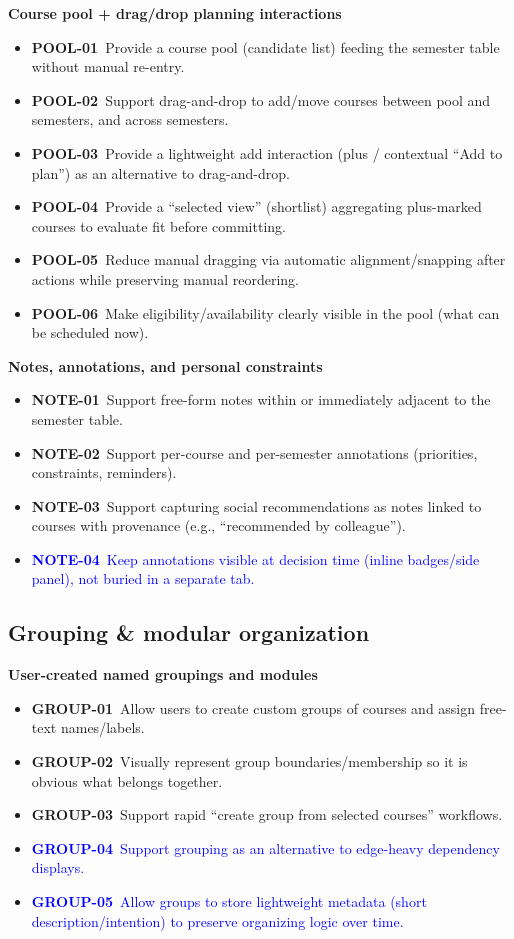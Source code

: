 \textbf{Course pool + drag/drop planning interactions}
\begin{itemize}
  \item \textbf{POOL-01}~Provide a course pool (candidate list) feeding the semester table without manual re-entry.
  \item \textbf{POOL-02}~Support drag-and-drop to add/move courses between pool and semesters, and across semesters.
  \item \textbf{POOL-03}~Provide a lightweight add interaction (plus / contextual “Add to plan”) as an alternative to drag-and-drop.
  \item \textbf{POOL-04}~Provide a “selected view” (shortlist) aggregating plus-marked courses to evaluate fit before committing.
  \item \textbf{POOL-05}~Reduce manual dragging via automatic alignment/snapping after actions while preserving manual reordering.
  \item \textbf{POOL-06}~Make eligibility/availability clearly visible in the pool (what can be scheduled now).
\end{itemize}

\textbf{Notes, annotations, and personal constraints}
\begin{itemize}
  \item \textbf{NOTE-01}~Support free-form notes within or immediately adjacent to the semester table.
  \item \textbf{NOTE-02}~Support per-course and per-semester annotations (priorities, constraints, reminders).
  \item \textbf{NOTE-03}~Support capturing social recommendations as notes linked to courses with provenance (e.g., “recommended by colleague”).
  \item \textcolor{blue}{\textbf{NOTE-04}~Keep annotations visible at decision time (inline badges/side panel), not buried in a separate tab.}
\end{itemize}


\subsection*{Grouping \& modular organization}

\textbf{User-created named groupings and modules}
\begin{itemize}
  \item \textbf{GROUP-01}~Allow users to create custom groups of courses and assign free-text names/labels.
  \item \textbf{GROUP-02}~Visually represent group boundaries/membership so it is obvious what belongs together.
  \item \textbf{GROUP-03}~Support rapid “create group from selected courses” workflows.
  \item \textcolor{blue}{\textbf{GROUP-04}~Support grouping as an alternative to edge-heavy dependency displays.}
  \item \textcolor{blue}{\textbf{GROUP-05}~Allow groups to store lightweight metadata (short description/intention) to preserve organizing logic over time.}
\end{itemize}

